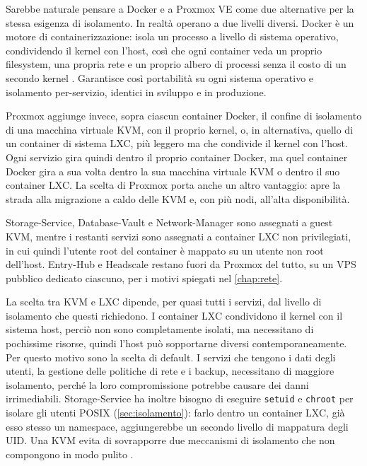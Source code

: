 Sarebbe naturale pensare a Docker e a Proxmox VE \cite{proxmox-ve} come due alternative per la stessa
esigenza di isolamento. In realtà operano a due livelli diversi. Docker è un motore di containerizzazione:
isola un processo a livello di sistema operativo, condividendo il kernel con l'host, così che ogni container 
veda un proprio filesystem, una propria rete e un proprio albero di processi senza il costo di un secondo 
kernel \cite{docker-overview}. Garantisce così portabilità su ogni sistema operativo e isolamento 
per-servizio, identici in sviluppo e in produzione.

Proxmox aggiunge invece, sopra ciascun container Docker, il confine di isolamento di una macchina virtuale 
KVM, con il proprio kernel, o, in alternativa, quello di un container di sistema LXC, più leggero ma che condivide il kernel 
con l'host. Ogni servizio gira quindi dentro il proprio container Docker, ma quel 
container Docker gira a sua volta dentro la sua macchina virtuale KVM o dentro il suo container LXC.
La scelta di Proxmox porta anche un altro vantaggio: apre la strada alla migrazione a caldo delle KVM
e, con più nodi, all'alta disponibilità.

Storage-Service, Database-Vault e Network-Manager sono assegnati a guest KVM, mentre i restanti 
servizi sono assegnati a container LXC non privilegiati, in cui quindi l'utente root del container è mappato 
su un utente non root dell'host. 
Entry-Hub e Headscale restano fuori da Proxmox del tutto, su un VPS pubblico dedicato ciascuno, per i
motivi spiegati nel \autoref{chap:rete}.

La scelta tra KVM e LXC dipende, per quasi tutti i servizi, dal livello di isolamento che questi richiedono. 
I container LXC condividono il kernel con il sistema host, perciò non sono completamente isolati, ma 
necessitano di pochissime risorse, quindi l'host può sopportarne diversi contemporaneamente. Per questo 
motivo sono la scelta di default. 
I servizi che tengono i dati degli utenti, la gestione delle politiche di rete e i backup, necessitano di 
maggiore isolamento, perché la loro compromissione potrebbe causare dei danni irrimediabili. 
Storage-Service ha inoltre bisogno di eseguire \texttt{setuid} e \texttt{chroot} per isolare gli utenti
POSIX (\autoref{sec:isolamento}): farlo dentro un container LXC, già esso stesso un namespace,
aggiungerebbe un secondo livello di mappatura degli UID. Una KVM evita di sovrapporre
due meccanismi di isolamento che non compongono in modo pulito \cite{ramusb-proxmox-storage-service}.


